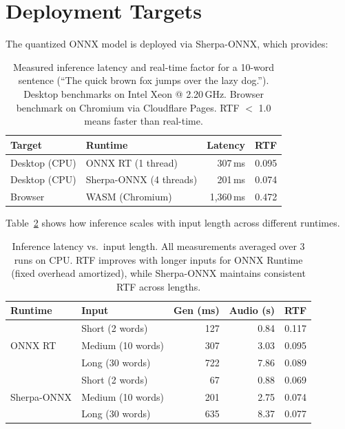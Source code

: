 \documentclass[10pt,a4paper,twocolumn]{article}
\begin{document}
\section{Deployment Targets}
\label{sec:deployment}

The quantized ONNX model is deployed via Sherpa-ONNX, which provides:

\begin{table}[ht]
\centering
\scriptsize
\begin{tabular}{@{}llrr@{}}
\toprule
\textbf{Target} & \textbf{Runtime} & \textbf{Latency} & \textbf{RTF} \\
\midrule
Desktop (CPU) & ONNX RT (1 thread) & 307\,ms & 0.095 \\
Desktop (CPU) & Sherpa-ONNX (4 threads) & 201\,ms & 0.074 \\
Browser & WASM (Chromium) & 1,360\,ms & 0.472 \\
\bottomrule
\end{tabular}
\caption{Measured inference latency and real-time factor for a 10-word sentence (``The quick brown fox jumps over the lazy dog.''). Desktop benchmarks on Intel Xeon @ 2.20\,GHz. Browser benchmark on Chromium via Cloudflare Pages. RTF $<$ 1.0 means faster than real-time.}
\label{tab:deployment}
\end{table}

Table~\ref{tab:inference_detail} shows how inference scales with input length across different runtimes.

\begin{table}[ht]
\centering
\scriptsize
\begin{tabular}{@{}llrrr@{}}
\toprule
\textbf{Runtime} & \textbf{Input} & \textbf{Gen (ms)} & \textbf{Audio (s)} & \textbf{RTF} \\
\midrule
\multirow{3}{*}{ONNX RT} & Short (2 words) & 127 & 0.84 & 0.117 \\
 & Medium (10 words) & 307 & 3.03 & 0.095 \\
 & Long (30 words) & 722 & 7.86 & 0.089 \\
\midrule
\multirow{3}{*}{Sherpa-ONNX} & Short (2 words) & 67 & 0.88 & 0.069 \\
 & Medium (10 words) & 201 & 2.75 & 0.074 \\
 & Long (30 words) & 635 & 8.37 & 0.077 \\
\bottomrule
\end{tabular}
\caption{Inference latency vs.\ input length. All measurements averaged over 3 runs on CPU. RTF improves with longer inputs for ONNX Runtime (fixed overhead amortized), while Sherpa-ONNX maintains consistent RTF across lengths.}
\label{tab:inference_detail}
\end{table}
\end{document}
